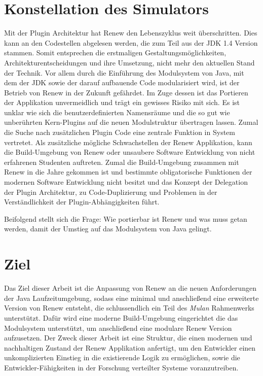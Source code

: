 \section{Konstellation des Simulators} \label{sec:KdS}

	Mit der Plugin Architektur hat Renew den Lebenszyklus weit überschritten. Dies kann an den Codestellen abgelesen werden, die zum Teil aus der JDK 1.4 Version stammen. Somit entsprechen die erstmaligen Gestaltungsmöglichkeiten, Architekturentscheidungen und ihre Umsetzung, nicht mehr den aktuellen Stand der Technik. Vor allem durch die Einführung des Modulsystem von Java, mit dem der JDK sowie der darauf aufbauende Code modularisiert wird, ist der Betrieb von Renew in der Zukunft gefährdet. Im Zuge dessen ist das Portieren der Applikation unvermeidlich und trägt ein gewisses Risiko mit sich. Es ist unklar wie sich die benutzerdefinierten Namensräume und die so gut wie unberührten Kern-Plugins auf die neuen Modulstruktur übertragen lassen. Zumal die Suche nach zusätzlichen Plugin Code eine zentrale Funktion in System vertretet.\newline
	Als zusätzliche mögliche Schwachstellen der Renew Applikation, kann die Build-Umgebung von Renew oder unsaubere Software Entwicklung von nicht erfahrenen Studenten auftreten. Zumal die Build-Umgebung zusammen mit Renew in die Jahre gekommen ist und bestimmte obligatorische Funktionen der modernen Software Entwicklung nicht besitzt und das Konzept der Delegation der Plugin Architektur, zu Code-Duplizierung und Problemen in der Verständlichkeit der Plugin-Abhängigkeiten führt.\bigbreak

	Beifolgend stellt sich die Frage: Wie portierbar ist Renew und was muss getan werden, damit der Umstieg auf das Modulsystem von Java gelingt.

\section{Ziel} \label{sec:Z}

	Das Ziel dieser Arbeit ist die Anpassung von Renew an die neuen Anforderungen der Java Laufzeitumgebung, sodass eine minimal und anschließend eine  erweiterte Version von Renew entsteht, die schlussendlich ein Teil des \textit{Mulan} Rahmenwerks unterstützt. Dafür wird eine moderne Build-Umgebung eingerichtet die das Modulsystem unterstützt, um anschließend eine modulare Renew Version aufzusetzen. 
	Der Zweck dieser Arbeit ist eine Struktur, die einen modernen und nachhaltigen Zustand der Renew Applikation anfertigt, um den Entwickler einen unkomplizierten Einstieg in die existierende Logik zu ermöglichen, sowie die Entwickler-Fähigkeiten in der Forschung verteilter Systeme voranzutreiben.\bigbreak

